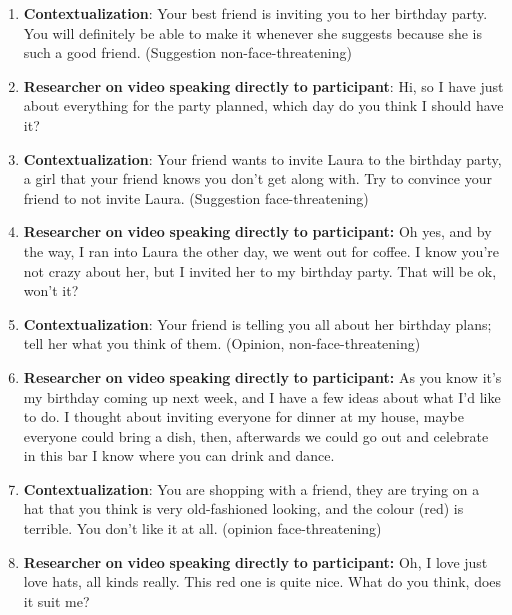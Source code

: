 \documentclass[output=paper]{langsci/langscibook}
\begin{document}
 \begin{enumerate}
\item \textbf{Contextualization}: Your best friend is inviting you to her birthday party. You will definitely be able to make it whenever she suggests because she is such a good friend. (Suggestion non-face-threatening)

\item \textbf{Researcher} \textbf{on} \textbf{video} \textbf{speaking} \textbf{directly} \textbf{to} \textbf{participant}: Hi, so I have just about everything for the party planned, which day do you think I should have it? 

\item  \textbf{Contextualization}: Your friend wants to invite Laura to the birthday party, a girl that your friend knows you don’t get along with. Try to convince your friend to not invite Laura.  (Suggestion face-threatening) 

\item \textbf{Researcher} \textbf{on} \textbf{video} \textbf{speaking} \textbf{directly} \textbf{to} \textbf{participant:} Oh yes, and by the way, I ran into Laura the other day, we went out for coffee. I know you’re not crazy about her, but I invited her to my birthday party. That will be ok, won’t it? 

\item \textbf{Contextualization}: Your friend is telling you all about her birthday plans; tell her what you think of them. (Opinion, non-face-threatening)

\item \textbf{Researcher} \textbf{on} \textbf{video} \textbf{speaking} \textbf{directly} \textbf{to} \textbf{participant:} As you know it’s my birthday coming up next week, and I have a few ideas about what I’d like to do. I thought about inviting everyone for dinner at my house, maybe everyone could bring a dish, then, afterwards we could go out and celebrate in this bar I know where you can drink and dance. 

\item \textbf{Contextualization}: You are shopping with a friend, they are trying on a hat that you think is very old-fashioned looking, and the colour (red) is terrible. You don’t like it at all. (opinion face-threatening) 

\item \textbf{Researcher} \textbf{on} \textbf{video} \textbf{speaking} \textbf{directly} \textbf{to} \textbf{participant:} Oh, I love just love hats, all kinds really. This red one is quite nice. What do you think, does it suit me? 


\end{enumerate}
\end{document}
